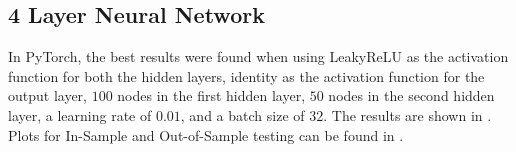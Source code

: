 \documentclass{article}
\begin{document}
%
     

\subsection{4 Layer Neural Network}

In PyTorch, the best results were found when using LeakyReLU as the activation function for both the hidden layers, identity as the activation function for the output layer, $100$ nodes in the first hidden layer, $50$ nodes in the second hidden layer, a learning rate of $0.01$, and a batch size of $32$. The results are shown in . Plots for In-Sample and Out-of-Sample testing can be found in .
\end{document}
